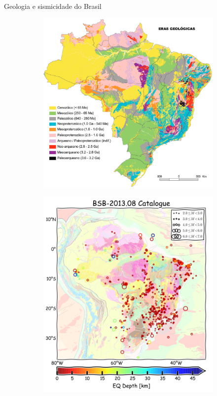 \documentclass[ucs,8pt]{beamer}
\begin{document}
\begin{frame}{Geologia e sismicidade do Brasil}
\begin{figure}[H]
	\scriptsize
	\centering
	\begin{subfigure}[t]{0.48\textwidth}
	  \centering
	  \includegraphics[width=1.0\textwidth]{tectonico_brasil} 
	  \label{fig:br_tec} 
	\end{subfigure}
	\begin{subfigure}[t]{0.48\textwidth}
	  \centering
	  \includegraphics[width=1.0\textwidth]{seismicity_br} 

\end{subfigure}
\end{figure}
\end{frame}
\end{document}

